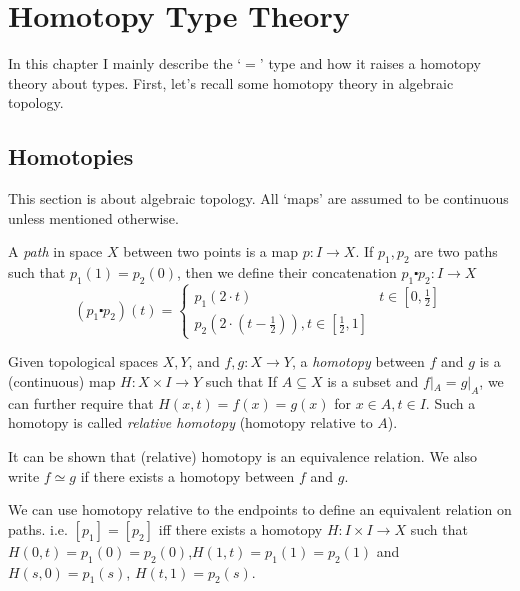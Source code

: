 \chapter{Homotopy Type Theory}
\label{HoTT}

In this chapter I mainly describe the `$=$' type and how it raises
a homotopy theory about types. First, let's recall some homotopy theory
in algebraic topology.

\section{Homotopies}

This section is about algebraic topology. All `maps' are assumed to be
continuous unless mentioned otherwise. 

\begin{definition}
    \label{path}
    A {\it path} in space $X$ between two points is a map $p: I\to X$.
    If $p_1,p_2$ are two paths such that $p_1(1)=p_2(0)$, then we
    define their concatenation $p_1\centerdot p_2: I\to X$
    $$
        (p_1\centerdot p_2)(t) = \begin{cases}
            p_1(2\cdot t) & t\in[0,\frac{1}{2}] \\
            p_2(2\cdot(t-\frac{1}{2})), t\in[\frac{1}{2}, 1]
        \end{cases}
    $$
\end{definition}

\begin{definition}
    \label{homotopy}
    Given topological spaces $X,Y$, and $f,g:X\to Y$, a {\it homotopy} between
    $f$ and $g$ is a (continuous) map $H:X\times I\to Y$ such that
    If $A\subseteq X$ is a subset and $f|_A=g|_A$, we can further require
    that $H(x, t)=f(x)=g(x)$ for $x\in A,t\in I$. Such a homotopy is called
    {\it relative homotopy} (homotopy relative to $A$). 

    It can be shown that (relative) homotopy is an equivalence relation.
    We also write $f\simeq g$ if there exists a homotopy between $f$ and
    $g$. 
\end{definition}

We can use homotopy relative to the endpoints to define an equivalent
relation on paths. i.e. $[p_1]=[p_2]$ iff there exists a homotopy 
$H: I\times I\to X$ such that $H(0, t)=p_1(0)=p_2(0)$,$
H(1,t)=p_1(1)=p_2(1)$ and $H(s,0)=p_1(s)$, $H(t,1)=p_2(s)$.


